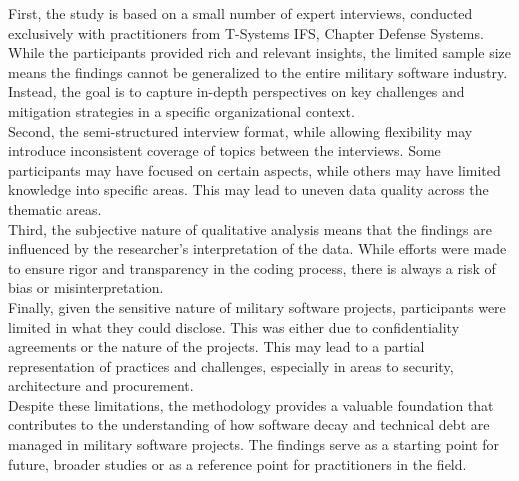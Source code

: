 First, the study is based on a small number of expert interviews, conducted exclusively with practitioners from T-Systems IFS, Chapter Defense Systems. While the participants provided rich and relevant insights, the limited sample size means the findings cannot be generalized to the entire military software industry. 
Instead, the goal is to capture in-depth perspectives on key challenges and mitigation strategies in a specific organizational context.\\

Second, the semi-structured interview format, while allowing flexibility may introduce inconsistent coverage of topics between the interviews. Some participants may have focused on certain aspects, while others may have limited knowledge into specific areas. This may lead to uneven data quality across the thematic areas.\\

Third, the subjective nature of qualitative analysis means that the findings are influenced by the researcher's interpretation of the data. While efforts were made to ensure rigor and transparency in the coding process, there is always a risk of bias or misinterpretation.\\

Finally, given the sensitive nature of military software projects, participants were limited in what they could disclose. This was either due to confidentiality agreements or the nature of the projects. This may lead to a partial representation of practices and challenges, especially in areas to security, architecture and procurement.\\

Despite these limitations, the methodology provides a valuable foundation that contributes to the understanding of how software decay and technical debt are managed in military software projects. The findings serve as a starting point for future, broader studies or as a reference point for practitioners in the field.\\